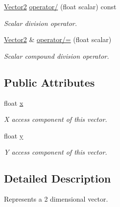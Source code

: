 \begin{DoxyCompactItemize}
\hyperlink{classchaos_1_1gfx_1_1_vector2}{Vector2} \hyperlink{classchaos_1_1gfx_1_1_vector2_a86fcd257dd859953cafffd69be1616f8}{operator/} (float scalar) const 
\begin{DoxyCompactList}\small\item\em Scalar division operator. \end{DoxyCompactList}\item 
\hyperlink{classchaos_1_1gfx_1_1_vector2}{Vector2} \& \hyperlink{classchaos_1_1gfx_1_1_vector2_abc4ba70fb8c781d02f97cce17f2ef31a}{operator/=} (float scalar)
\begin{DoxyCompactList}\small\item\em Scalar compound division operator. \end{DoxyCompactList}\end{DoxyCompactItemize}
\subsection*{Public Attributes}
\begin{DoxyCompactItemize}
\item 
\hypertarget{classchaos_1_1gfx_1_1_vector2_a98989a2809ad9c6ac3091550ad5f5118}{float \hyperlink{classchaos_1_1gfx_1_1_vector2_a98989a2809ad9c6ac3091550ad5f5118}{x}}\label{classchaos_1_1gfx_1_1_vector2_a98989a2809ad9c6ac3091550ad5f5118}

\begin{DoxyCompactList}\small\item\em X access component of this vector. \end{DoxyCompactList}\item 
\hypertarget{classchaos_1_1gfx_1_1_vector2_adf4d8ed8e49c84c2fe1596c2b9d55d49}{float \hyperlink{classchaos_1_1gfx_1_1_vector2_adf4d8ed8e49c84c2fe1596c2b9d55d49}{y}}\label{classchaos_1_1gfx_1_1_vector2_adf4d8ed8e49c84c2fe1596c2b9d55d49}

\begin{DoxyCompactList}\small\item\em Y access component of this vector. \end{DoxyCompactList}\end{DoxyCompactItemize}


\subsection{Detailed Description}
Represents a 2 dimensional vector. 

